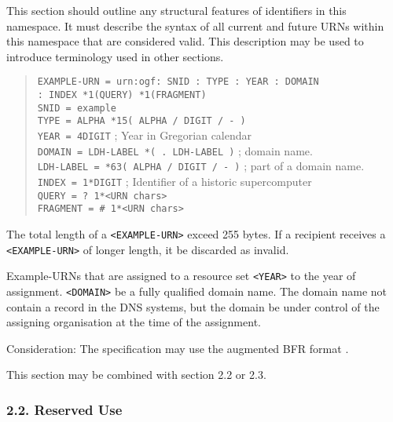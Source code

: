\documentclass[12pt]{article}  %
\begin{document}
This section should outline any structural features of identifiers in this namespace.  
It must describe the syntax of all current and future URNs within this namespace 
that are considered valid.
This description may be used to introduce terminology used in other sections.

\begin{example}
\begin{quote}
  \texttt{EXAMPLE-URN = \qq{}urn:ogf:\qq{} SNID \qq{}:\qq{} TYPE \qq{}:\qq{} YEAR \qq{}:\qq{} DOMAIN} \\
  \hspace*{2cm}\texttt{\qq{}:\qq{} INDEX *1(QUERY) *1(FRAGMENT) } \\
  \texttt{SNID = \qq{}example\qq{}} \\
  \texttt{TYPE = ALPHA *15( ALPHA / DIGIT / \qq{}-\qq{} )} \\
  \texttt{YEAR = 4DIGIT} ; Year in Gregorian calendar \\
  \texttt{DOMAIN = LDH-LABEL *( \qq{}.\qq{} LDH-LABEL )} ; domain name. \\
  \texttt{LDH-LABEL = *63( ALPHA / DIGIT / \qq{}-\qq{} )} ; part of a domain name. \\
  \texttt{INDEX = 1*DIGIT} ; Identifier of a historic supercomputer \\
  \texttt{QUERY = \qq{}?\qq{} 1*<URN chars>} \\
  \texttt{FRAGMENT = \qq{}\#\qq{} 1*<URN chars>}
\end{quote}

The total length of a \texttt{<EXAMPLE-URN>} \MUSTNOT{} exceed 255 bytes.
If a recipient receives a \texttt{<EXAMPLE-URN>} of longer length, it \MUST{} be discarded 
as invalid.

Example-URNs that are assigned to a resource \MUST{} set \texttt{<YEAR>} 
to the year of assignment. \texttt{<DOMAIN>} \MUST{} be a fully 
qualified domain name. The domain name \MAY{} not contain a record 
in the DNS systems, but the domain \MUST{} be under control of the 
assigning organisation at the time of the assignment.
\end{example}

Consideration: The specification may use the augmented BFR format \cite{rfc5234}.

This section may be combined with section 2.2 or 2.3.

\subsubsection*{2.2. Reserved Use}
\end{document}
